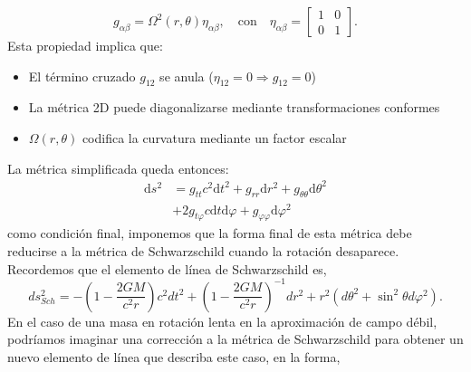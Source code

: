 \begin{equation}
    g_{\alpha\beta} = \Omega^2(r,\theta) \eta_{\alpha\beta}, \quad \text{con} \quad \eta_{\alpha\beta} = \begin{bmatrix}
        1 & 0 \\
        0 & 1
    \end{bmatrix}.
\end{equation}
Esta propiedad implica que:
\begin{itemize}
    \item El término cruzado $g_{12}$ se anula ($\eta_{12} = 0 \Rightarrow g_{12} = 0$)
    \item La métrica 2D puede diagonalizarse mediante transformaciones conformes
    \item $\Omega(r,\theta)$ codifica la curvatura mediante un factor escalar
\end{itemize}
La métrica simplificada queda entonces:
\begin{align}
    \mathrm{d}s^2 & = g_{tt} c^2 \mathrm{d}t^2 + g_{rr} \mathrm{d}r^2 + g_{\theta\theta} \mathrm{d}\theta^2 \nonumber \\
                  & + 2 g_{t\varphi} c \mathrm{d}t \mathrm{d}\varphi + g_{\varphi\varphi} \mathrm{d}\varphi^2
\end{align}
como condición final, imponemos que la forma final de esta métrica debe reducirse a la métrica de Schwarzschild cuando la rotación desaparece.
Recordemos que el elemento de línea de Schwarzschild es,
$$
    d s_{Sch}^2=-\left(1-\frac{2 G M}{c^2 r}\right) c^2 d t^2+\left(1-\frac{2 G M}{c^2 r}\right)^{-1} d r^2+r^2\left(d \theta^2+\sin ^2 \theta d \varphi^2\right).
$$
En el caso de una masa en rotación lenta en la aproximación de campo débil, podríamos imaginar una corrección a la métrica de Schwarzschild para obtener un nuevo elemento de línea que describa este caso, en la forma,

